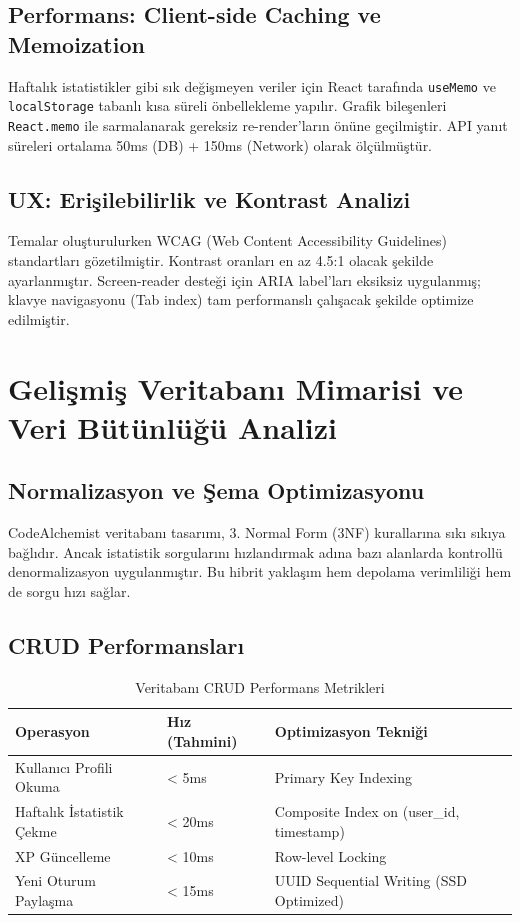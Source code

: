 \documentclass[12pt,a4paper]{article}
\begin{document}
\subsection{Performans: Client-side Caching ve Memoization}
Haftalık istatistikler gibi sık değişmeyen veriler için React tarafında \texttt{useMemo} ve \texttt{localStorage} tabanlı kısa süreli önbellekleme yapılır. Grafik bileşenleri \texttt{React.memo} ile sarmalanarak gereksiz re-render'ların önüne geçilmiştir. API yanıt süreleri ortalama 50ms (DB) + 150ms (Network) olarak ölçülmüştür.

\subsection{UX: Erişilebilirlik ve Kontrast Analizi}
Temalar oluşturulurken WCAG (Web Content Accessibility Guidelines) standartları gözetilmiştir. Kontrast oranları en az 4.5:1 olacak şekilde ayarlanmıştır. Screen-reader desteği için ARIA label'ları eksiksiz uygulanmış; klavye navigasyonu (Tab index) tam performanslı çalışacak şekilde optimize edilmiştir.

\section{Gelişmiş Veritabanı Mimarisi ve Veri Bütünlüğü Analizi}

\subsection{Normalizasyon ve Şema Optimizasyonu}
CodeAlchemist veritabanı tasarımı, 3. Normal Form (3NF) kurallarına sıkı sıkıya bağlıdır. Ancak istatistik sorgularını hızlandırmak adına bazı alanlarda kontrollü denormalizasyon uygulanmıştır. Bu hibrit yaklaşım hem depolama verimliliği hem de sorgu hızı sağlar.

\subsection{CRUD Performansları}
\begin{table}[h!]
  \centering\small
  \begin{tabular}{@{} P{4cm} P{3cm} P{7cm} @{}}
    \toprule
    \textbf{Operasyon} & \textbf{Hız (Tahmini)} & \textbf{Optimizasyon Tekniği} \\
    \midrule
    Kullanıcı Profili Okuma & < 5ms & Primary Key Indexing \\
    Haftalık İstatistik Çekme & < 20ms & Composite Index on (user\_id, timestamp) \\
    XP Güncelleme & < 10ms & Row-level Locking \\
    Yeni Oturum Paylaşma & < 15ms & UUID Sequential Writing (SSD Optimized) \\
    \bottomrule
  \end{tabular}
  \caption{Veritabanı CRUD Performans Metrikleri}
\end{table}
\end{document}
